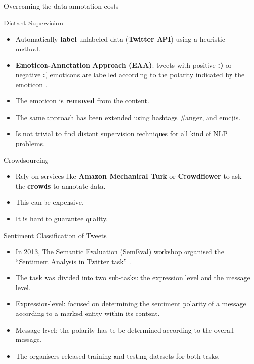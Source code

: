 \documentclass[handout]{beamer}
\begin{document}
\begin{frame}{Overcoming the data annotation costs}
\begin{scriptsize}
\begin{block}{Distant Supervision}
  \begin{itemize}
   \item Automatically \textbf{label} unlabeled data (\textbf{Twitter API}) using a heuristic method.
   \item \textbf{Emoticon-Annotation Approach (EAA)}: tweets with positive \textcolor[rgb]{0.00,0.00,1.00}{\textbf{:)}} or negative \textcolor[rgb]{1.00,0.00,0.00}{\textbf{:(}} emoticons are labelled according to the polarity indicated by the emoticon~\cite{Read2005}.
  \item The emoticon is \textbf{removed} from the content.
  \item The same approach has been extended using hashtags \#anger, and emojis.
\item Is not trivial to find distant supervision techniques for all kind of NLP problems.
\end{itemize} 
 
\end{block}

\begin{block}{Crowdsourcing}
  \begin{itemize}
\item Rely on services like \textbf{Amazon Mechanical Turk} or \textbf{Crowdflower} to ask the \textbf{crowds} to annotate data.
\item This can be expensive.
\item It is hard to guarantee quality. 
   \end{itemize} 
 
\end{block}

\end{scriptsize}

\end{frame}




\begin{frame}{Sentiment Classification of Tweets}
\begin{scriptsize}
\begin{itemize}
\item In 2013, The Semantic Evaluation (SemEval) workshop organised the
``Sentiment Analysis in Twitter
task'' \cite{Semeval2013}.
 \item The task was divided into two sub-tasks: the expression
level and the message level. 
\item Expression-level: focused on determining
the sentiment polarity of a message according to a marked entity within
its content.
\item Message-level: the polarity has to be determined according to
the overall message.
\item  The organisers released training and testing datasets
for both tasks.
\cite{Semeval2013}
\end{itemize}
\end{scriptsize}
\end{frame}
\end{document}
